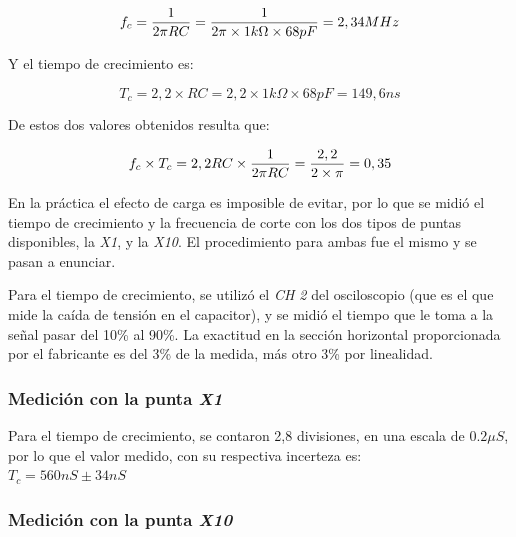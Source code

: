 \documentclass{article}
\begin{document}
\begin{equation*}
	f_c = {1 \over 2 \pi RC} = {1 \over 2 \pi \times 1k\Omega \times 68pF} = 2,34 MHz
\end{equation*}
\medskip

Y el tiempo de crecimiento es:
\medskip

\begin{equation*}
	T_c = 2,2 \times RC = 2,2 \times 1k\Omega \times 68pF = 149,6 ns
\end{equation*}
\medskip

De estos dos valores obtenidos resulta que:
\medskip

\begin{equation*}
	f_c \times T_c = 2,2 RC \times {1 \over 2 \pi RC} = {2,2 \over 2 \times \pi} = 0,35
\end{equation*}
\medskip


	En la práctica el efecto de carga es imposible de evitar, por lo que se midió el tiempo de crecimiento y la frecuencia de corte con los dos tipos de puntas disponibles, la \textit{X1}, y la \textit{X10}. El procedimiento para ambas fue el mismo y se pasan a enunciar.
	\par
	Para el tiempo de crecimiento, se utilizó el \textit{CH 2} del osciloscopio (que es el que mide la caída de tensión en el capacitor), y se midió el tiempo que le toma a la señal pasar del 10\% al 90\%. La exactitud en la sección horizontal proporcionada por el fabricante es del 3\% de la medida, más otro 3\% por linealidad.
	\par



\subsubsection{Medición con la punta \textit{X1}}
	
	Para el tiempo de crecimiento, se contaron 2,8 divisiones, en una escala de $0.2 \mu S$, por lo que el valor medido, con su respectiva incerteza es: \\

$T_c = 560 nS \pm 34 nS$\\


\subsubsection{Medición con la punta \textit{X10}} 
\end{document}
